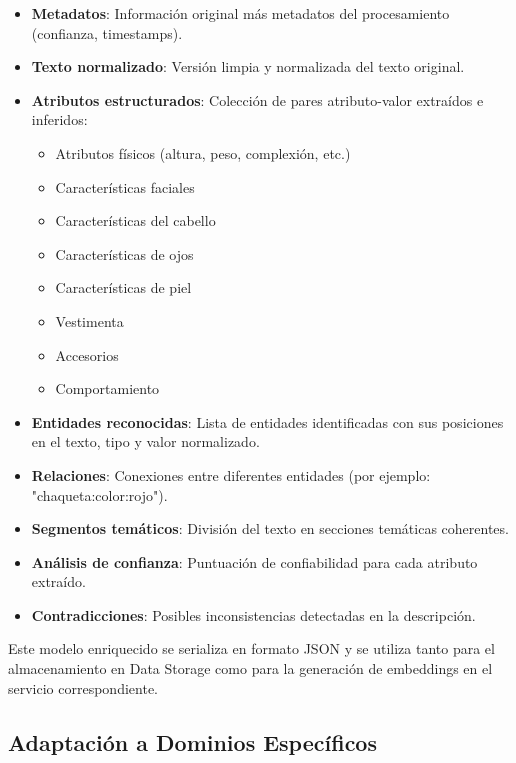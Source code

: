 \documentclass[12pt,a4paper]{article}
\begin{document}
\begin{itemize}
    \item \textbf{Metadatos}: Información original más metadatos del procesamiento (confianza, timestamps).
    
    \item \textbf{Texto normalizado}: Versión limpia y normalizada del texto original.
    
    \item \textbf{Atributos estructurados}: Colección de pares atributo-valor extraídos e inferidos:
    \begin{itemize}
        \item Atributos físicos (altura, peso, complexión, etc.)
        \item Características faciales
        \item Características del cabello
        \item Características de ojos
        \item Características de piel
        \item Vestimenta
        \item Accesorios
        \item Comportamiento
    \end{itemize}
    
    \item \textbf{Entidades reconocidas}: Lista de entidades identificadas con sus posiciones en el texto, tipo y valor normalizado.
    
    \item \textbf{Relaciones}: Conexiones entre diferentes entidades (por ejemplo: "chaqueta:color:rojo").
    
    \item \textbf{Segmentos temáticos}: División del texto en secciones temáticas coherentes.
    
    \item \textbf{Análisis de confianza}: Puntuación de confiabilidad para cada atributo extraído.
    
    \item \textbf{Contradicciones}: Posibles inconsistencias detectadas en la descripción.
\end{itemize}

Este modelo enriquecido se serializa en formato JSON y se utiliza tanto para el almacenamiento en Data Storage como para la generación de embeddings en el servicio correspondiente.

\subsection{Adaptación a Dominios Específicos}
\label{subsec:dp-adaptacion}
\end{document}
